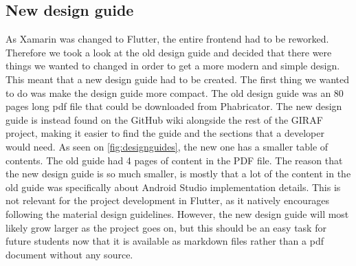 \subsection{New design guide}
As Xamarin was changed to Flutter, the entire frontend had to be reworked. 
Therefore we took a look at the old design guide and decided that there were things we wanted to changed in order to get a more modern and simple design.
This meant that a new design guide had to be created.
The first thing we wanted to do was make the design guide more compact.
The old design guide was an 80 pages long pdf file that could be downloaded from Phabricator.
The new design guide is instead found on the GitHub wiki alongside the rest of the GIRAF project, making it easier to find the guide and the sections that a developer would need.
As seen on \autoref{fig:designguides}, the new one has a smaller table of contents.
The old guide had 4 pages of content in the PDF file.
The reason that the new design guide is so much smaller, is mostly that a lot of the content in the old guide was specifically about Android Studio implementation details.
This is not relevant for the project development in Flutter, as it natively encourages following the material design guidelines.
However, the new design guide will most likely grow larger as the project goes on, but this should be an easy task for future students now that it is available as markdown files rather than a pdf document without any source. 

